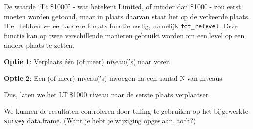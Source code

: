 \documentclass[]{tufte-book}
\newenvironment{Shaded}{}{}
\newcommand{\DataTypeTok}[1]{\textcolor[rgb]{0.56,0.13,0.00}{#1}}
\newcommand{\KeywordTok}[1]{\textcolor[rgb]{0.00,0.44,0.13}{\textbf{#1}}}
\newcommand{\NormalTok}[1]{#1}
\newcommand{\OperatorTok}[1]{\textcolor[rgb]{0.40,0.40,0.40}{#1}}
\newcommand{\StringTok}[1]{\textcolor[rgb]{0.25,0.44,0.63}{#1}}
\begin{document}
De waarde ``Lt \$1000'' - wat betekent Limited, of minder dan \$1000 - zou eerst moeten worden getoond, maar in plaats daarvan staat het op de verkeerde plaats. Hier hebben we een andere forcats functie nodig, namelijk \texttt{fct\_relevel}. Deze functie kan op twee verschillende manieren gebruikt worden om een level op een andere plaats te zetten.

\textbf{Optie 1}: Verplaats één (of meer) niveau('s) naar voren

\begin{Shaded}
\end{Shaded}

\textbf{Optie 2}: Een (of meer) niveau('s) invoegen na een aantal N van niveaus

\begin{Shaded}
\end{Shaded}

Dus, laten we het LT \$1000 niveau naar de eerste plaats verplaatsen.

\begin{Shaded}
\end{Shaded}

We kunnen de resultaten controleren door telling te gebruiken op het bijgewerkte \texttt{survey} data.frame. (Want je hebt je wijziging opgeslaan, toch?)
\end{document}
